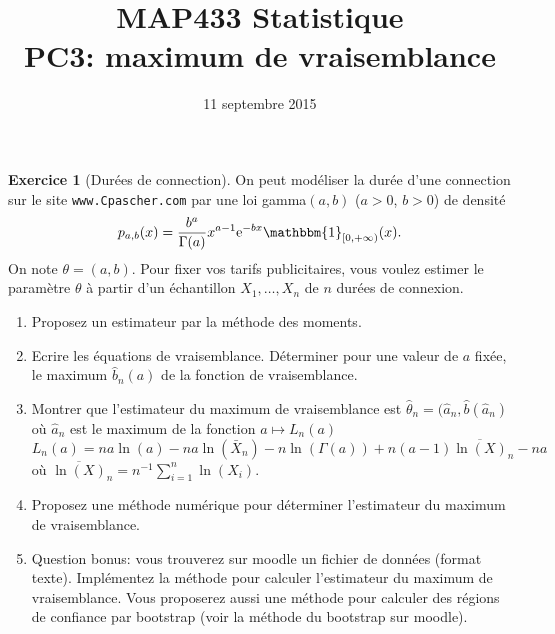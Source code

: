 \documentclass[a4paper,11pt,fleqn]{article}
\title{{\bf MAP433 Statistique}\\
{\bf PC3: maximum de vraisemblance}}
\date{11 septembre 2015}
\def\1{\mathbbm{1}}
\def\rme{\mathrm{e}}
\theoremstyle{definition}
\newtheorem{exercice}{Exercice}
\newcommand{\coint}[1]{\left[#1\right)}
\begin{document}
\maketitle

\begin{exercice}[Dur\'ees de connection]
On peut mod\'eliser la dur\'ee d'une connection sur le site {\tt www.Cpascher.com} par une loi gamma$(a,b)$ ($a > 0$, $b> 0$) de densit\'e
$$  p_{a,b}(x) = \frac{b^a}{\Gamma(a)} x^{a-1} \rme^{- b x } \1_{\coint{0,+\infty}}(x).$$
On note $\theta= (a,b)$.
Pour fixer vos tarifs publicitaires, vous voulez estimer le param\`etre $\theta$ \`a partir
 d'un \'echantillon $X_1,\ldots,X_n$  de $n$ dur\'ees de connexion. 
\begin{enumerate}
\item  Proposez un estimateur par la m\'ethode des moments. 
\item  Ecrire les équations de vraisemblance. Déterminer pour une valeur de $a$ fixée, le maximum $\hat{b}_n(a)$ de la fonction de vraisemblance.
\item  Montrer que l'estimateur du maximum de vraisemblance est $\hat{\theta}_n= (\hat{a}_n, \hat{b}(\hat{a}_n)$ où $\hat{a}_n$ est le maximum de la fonction $a \mapsto L_n(a)$
$$
L_n(a)= n a \ln(a) - n a \ln(\bar{X}_n) -n \ln(\Gamma(a))+ n(a-1)\overline{\ln(X)}_n - n a 
$$
où $\overline{\ln(X)}_n= n^{-1} \sum_{i=1}^n \ln(X_i)$. 
\item Proposez une méthode numérique pour déterminer l'estimateur du maximum de vraisemblance.  
\item Question bonus: vous trouverez sur moodle un fichier de données (format texte). Implémentez la méthode pour calculer l'estimateur du maximum de vraisemblance. Vous proposerez aussi une méthode pour calculer des régions de confiance par bootstrap (voir la méthode du bootstrap sur moodle).
\end{enumerate}
\end{exercice}
\end{document}

